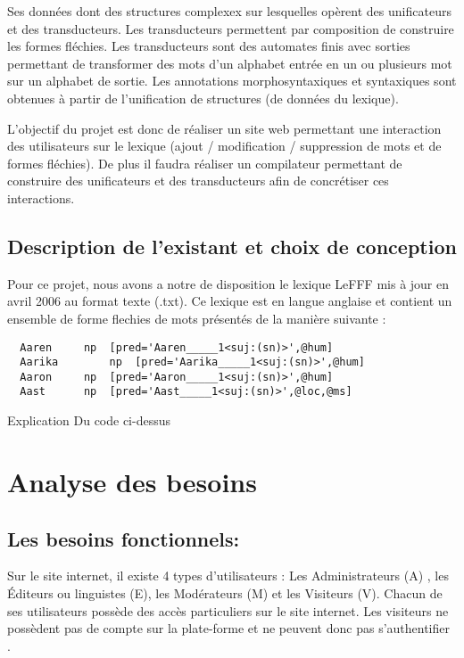 \documentclass{article}
\begin{document}
Ses données dont des structures complexex sur lesquelles opèrent des unificateurs et des transducteurs.
Les transducteurs permettent par composition de construire les formes fléchies. 
Les transducteurs sont des automates finis avec sorties permettant de transformer des mots d'un alphabet entrée en un ou plusieurs mot sur un alphabet de sortie.
Les annotations morphosyntaxiques et syntaxiques sont obtenues à partir de l'unification de structures (de données du lexique).

L'objectif du projet est donc de réaliser un site web permettant une interaction des utilisateurs sur le lexique (ajout / modification / suppression de mots et de formes fléchies). 
De plus il faudra réaliser un compilateur permettant de construire des unificateurs et des transducteurs afin de concrétiser ces interactions.

\subsection{Description de l'existant et choix de conception}
Pour ce projet, nous avons a notre de disposition le lexique LeFFF mis à jour en avril 2006 au format texte (.txt).
Ce lexique est en langue anglaise et contient un ensemble de forme flechies de mots présentés de la manière suivante :
\begin{verbatim}
  Aaren		np	[pred='Aaren_____1<suj:(sn)>',@hum]
  Aarika		np	[pred='Aarika_____1<suj:(sn)>',@hum]
  Aaron		np	[pred='Aaron_____1<suj:(sn)>',@hum]
  Aast		np	[pred='Aast_____1<suj:(sn)>',@loc,@ms]
\end{verbatim}
 Explication Du code ci-dessus
 
\section{Analyse des besoins}

\subsection{Les besoins fonctionnels:}

Sur le site internet, il existe 4 types d’utilisateurs : Les Administrateurs (A) , les Éditeurs ou linguistes (E), les Modérateurs (M) et les Visiteurs (V).
Chacun de ses utilisateurs possède des accès particuliers sur le site internet.
Les visiteurs ne possèdent pas de compte sur la plate-forme et ne peuvent donc pas s'authentifier . 
\end{document}
